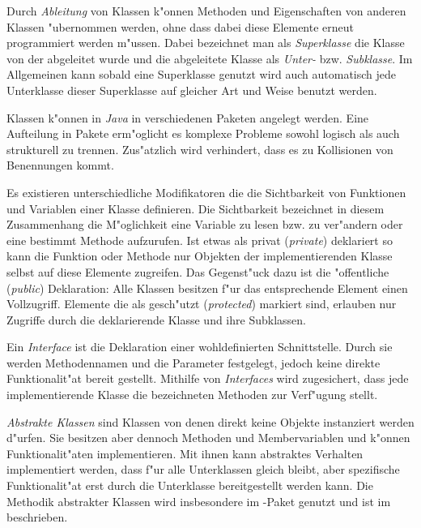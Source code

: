 Durch \emph{Ableitung} von Klassen k"onnen Methoden und Eigenschaften von anderen Klassen "ubernommen werden, ohne dass dabei diese Elemente erneut programmiert werden m"ussen.
Dabei bezeichnet man als \emph{Superklasse} die Klasse von der abgeleitet wurde und die abgeleitete Klasse als \emph{Unter-} bzw. \emph{Subklasse}.
Im Allgemeinen kann sobald eine Superklasse genutzt wird auch automatisch jede Unterklasse dieser Superklasse auf gleicher Art und Weise benutzt werden.

Klassen k"onnen in \emph{Java} in verschiedenen Paketen angelegt werden.
Eine Aufteilung in Pakete erm"oglicht es komplexe Probleme sowohl logisch als auch strukturell zu trennen.
Zus"atzlich wird verhindert, dass es zu Kollisionen von Benennungen kommt.

Es existieren unterschiedliche Modifikatoren die die Sichtbarkeit von Funktionen und Variablen einer Klasse definieren.
Die Sichtbarkeit bezeichnet in diesem Zusammenhang die M"oglichkeit eine Variable zu lesen bzw. zu ver"andern oder eine bestimmt Methode aufzurufen.
Ist etwas als privat (\emph{private}) deklariert so kann die Funktion oder Methode nur Objekten der implementierenden Klasse selbst auf diese Elemente zugreifen.
Das Gegenst"uck dazu ist die "offentliche (\emph{public}) Deklaration: Alle Klassen besitzen f"ur das entsprechende Element einen Vollzugriff.
Elemente die als gesch"utzt (\emph{protected}) markiert sind, erlauben nur Zugriffe durch die deklarierende Klasse und ihre Subklassen.

Ein \emph{Interface} ist die Deklaration einer wohldefinierten Schnittstelle.
Durch sie werden Methodennamen und die Parameter festgelegt, jedoch keine direkte Funktionalit"at bereit gestellt.
Mithilfe von \emph{Interfaces} wird zugesichert, dass jede implementierende Klasse die bezeichneten Methoden zur Verf"ugung stellt.

\emph{Abstrakte Klassen} sind Klassen von denen direkt keine Objekte instanziert werden d"urfen.
Sie besitzen aber dennoch Methoden und Membervariablen und k"onnen Funktionalit"aten implementieren.
Mit ihnen kann abstraktes Verhalten implementiert werden, dass f"ur alle Unterklassen gleich bleibt, aber spezifische Funktionalit"at erst durch die Unterklasse bereitgestellt werden kann.
Die Methodik abstrakter Klassen wird insbesondere im -Paket genutzt und ist im  beschrieben.

